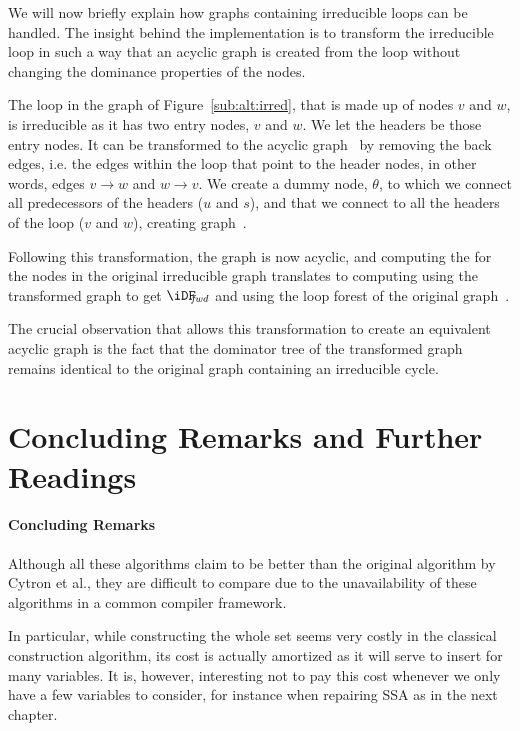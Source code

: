 {We will now briefly explain how graphs containing irreducible loops can be handled. 
The insight behind the implementation is to transform the irreducible loop in such a way that an acyclic graph is created from the loop without changing the dominance properties of the nodes.

The loop in the graph of Figure~\ref{sub:alt:irred}, that is made up of nodes $v$ and $w$, is irreducible as it has two entry nodes, $v$ and $w$. 
We let the headers be those entry nodes. 
It can be transformed to the acyclic graph~ by removing the back edges, i.e.  the edges within the loop that point to the header nodes, in other words, edges $v\rightarrow w$ and $w\rightarrow v$. 
We create a dummy node, $\theta$, to which we connect all predecessors of the headers ($u$ and $s$), and that we connect to all the headers of the loop ($v$ and $w$), creating graph~.

Following this transformation, the graph is now acyclic, and computing the \iDF for the nodes in the original irreducible graph translates to computing \iDF using the transformed graph to get $\iDFfwd$ and using the loop forest of the original graph~.

The crucial observation that allows this transformation to create an equivalent acyclic graph is the fact that the dominator tree of the transformed graph remains identical to the original graph containing an irreducible cycle.

\section{Concluding Remarks and Further Readings}
\paragraph{Concluding Remarks}
Although all these algorithms claim to be better than the original algorithm by Cytron et al., they are difficult to compare due to the unavailability of these algorithms in a common compiler framework.

In particular, while constructing the whole \iDF set seems very costly in the classical construction algorithm, its cost is actually amortized as it will serve to insert \phifuns for many variables. 
It is, however, interesting not to pay this cost whenever we only have a few variables to consider, for instance when repairing SSA as in the next chapter.

}
